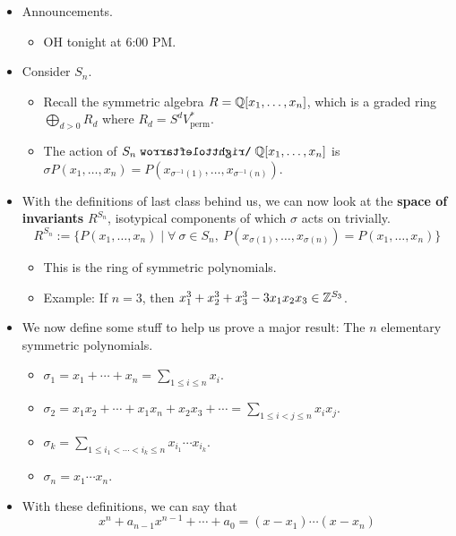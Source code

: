 \documentclass[../notes.tex]{subfiles}
\begin{document}
\begin{itemize}
    \item {}Announcements.
    \begin{itemize}
        \item OH tonight at 6:00 PM.
    \end{itemize}
    \item Consider $S_n$.
    \begin{itemize}
        \item Recall the symmetric algebra $R=\mathbb{Q}[x_1,\dots,x_n]$, which is a graded ring $\bigoplus_{d>0}R_d$ where $R_d=S^dV_\text{perm}^*$.
        \item The action of $S_n\acts\Q[x_1,\dots,x_n]$ is $\sigma P(x_1,\dots,x_n)=P(x_{\sigma^{-1}(1)},\dots,x_{\sigma^{-1}(n)})$.
    \end{itemize}
    \item With the definitions of last class behind us, we can now look at the \textbf{space of invariants} $R^{S_n}$, isotypical components of which $\sigma$ acts on trivially.
    \begin{equation*}
        R^{S_n} := \{P(x_1,\dots,x_n)\mid\forall\ \sigma\in S_n,\ P(x_{\sigma(1)},\dots,x_{\sigma(n)})=P(x_1,\dots,x_n)\}
    \end{equation*}
    \begin{itemize}
        \item This is the ring of symmetric polynomials.
        \item Example: If $n=3$, then $x_1^3+x_2^3+x_3^3-3x_1x_2x_3\in\mathbb{Z}^{S_3}$.
    \end{itemize}
    \item We now define some stuff to help us prove a major result: The $n$ elementary symmetric polynomials.
    \begin{itemize}
        \item $\sigma_1=x_1+\cdots+x_n=\sum_{1\leq i\leq n}x_i$.
        \item $\sigma_2=x_1x_2+\cdots+x_1x_n+x_2x_3+\cdots=\sum_{1\leq i<j\leq n}x_ix_j$.
        \item $\sigma_k=\sum_{1\leq i_1<\cdots<i_k\leq n}x_{i_1}\cdots x_{i_k}$.
        \item $\sigma_n=x_1\cdots x_n$.
    \end{itemize}
    \item With these definitions, we can say that
    \begin{equation*}
        x^n+a_{n-1}x^{n-1}+\cdots+a_0 = (x-x_1)\cdots(x-x_n)
    \end{equation*}

\end{itemize}
\end{document}
